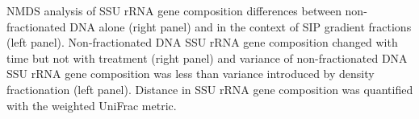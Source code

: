 NMDS analysis of SSU rRNA gene composition differences between 
non-fractionated DNA alone (right panel) and in the context of SIP gradient
fractions (left panel). Non-fractionated DNA SSU rRNA gene composition changed
with time but not with treatment (right panel) and variance of non-fractionated
DNA SSU rRNA gene composition was less than variance introduced by density
fractionation (left panel). Distance in SSU rRNA gene composition was
quantified with the weighted UniFrac metric.

